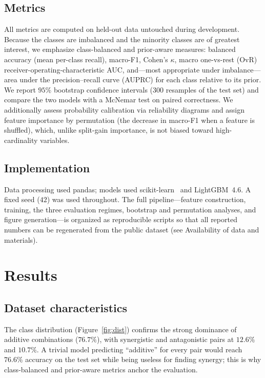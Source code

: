 \documentclass[11pt]{article}
\begin{document}
\subsection{Metrics}
All metrics are computed on held-out data untouched during development. Because the classes are
imbalanced and the minority classes are of greatest interest, we emphasize class-balanced and
prior-aware measures: balanced accuracy (mean per-class recall), macro-F1, Cohen's $\kappa$, macro
one-vs-rest (OvR) receiver-operating-characteristic AUC, and---most appropriate under imbalance---area
under the precision--recall curve (AUPRC) for each class relative to its prior. We report $95\%$
bootstrap confidence intervals ($300$ resamples of the test set) and compare the two models with a
McNemar test on paired correctness. We additionally assess probability calibration via reliability
diagrams and assign feature importance by permutation (the decrease in macro-F1 when a feature is
shuffled), which, unlike split-gain importance, is not biased toward high-cardinality variables.

\subsection{Implementation}
Data processing used pandas; models used scikit-learn~\cite{pedregosa2011} and LightGBM~4.6. A fixed
seed ($42$) was used throughout. The full pipeline---feature construction, training, the three
evaluation regimes, bootstrap and permutation analyses, and figure generation---is organized as
reproducible scripts so that all reported numbers can be regenerated from the public dataset (see
Availability of data and materials).

\section{Results}

\subsection{Dataset characteristics}
The class distribution (Figure~\ref{fig:dist}) confirms the strong dominance of additive combinations
($76.7\%$), with synergistic and antagonistic pairs at $12.6\%$ and $10.7\%$. A trivial model
predicting ``additive'' for every pair would reach $76.6\%$ accuracy on the test set while being
useless for finding synergy; this is why class-balanced and prior-aware metrics anchor the evaluation.
\end{document}
